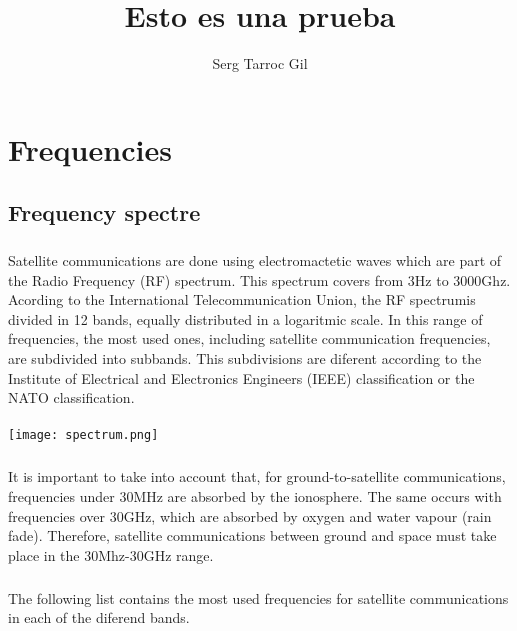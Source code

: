 \documentclass[12pt,a4paper]{report}
\author{Serg Tarroc Gil}
\title{Esto es una prueba}
\begin{document}
\maketitle

\chapter{Frequencies}

\section{Frequency spectre}
\paragraph{}Satellite communications are done using electromactetic waves which are part of the Radio Frequency (RF) spectrum. This spectrum covers from 3Hz to 3000Ghz. Acording to the International Telecommunication Union, the RF spectrumis divided in 12 bands, equally distributed in a logaritmic scale. In this range of frequencies, the most used ones, including satellite communication frequencies, are subdivided into subbands. This subdivisions are diferent according to the Institute of Electrical and Electronics Engineers (IEEE) classification or the NATO classification.\\
\\
\texttt{[image: spectrum.png]}

\paragraph{}It is important to take into account that, for ground-to-satellite communications, frequencies under 30MHz are absorbed by the ionosphere. The same occurs with frequencies over 30GHz, which are absorbed by oxygen and water vapour (rain fade). Therefore, satellite communications between ground and space must take place in the 30Mhz-30GHz range.

\paragraph{}The following list contains the most used frequencies for satellite communications in each of the diferend bands.
\end{document}
